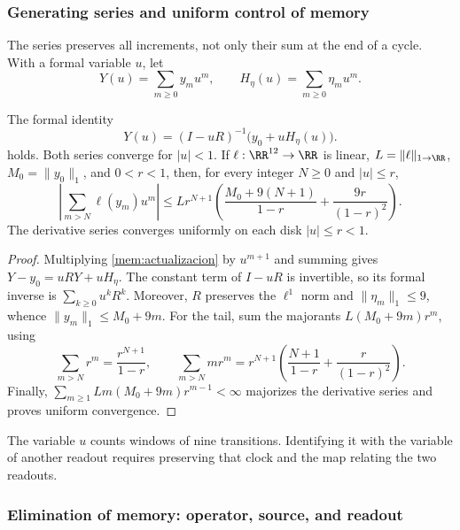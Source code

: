 \subsubsection{Generating series and uniform control of memory}

The series preserves all increments, not only their sum at the end
of a cycle. With a formal variable \(u\), let
\[
 Y(u)=\sum_{m\geq0}y_mu^m,\qquad
 H_\eta(u)=\sum_{m\geq0}\eta_mu^m.
\]

\begin{proposition}
\label{mem:prop-serie}
The formal identity
\begin{equation}
 Y(u)=(I-uR)^{-1}\bigl(y_0+uH_\eta(u)\bigr).
 \label{mem:serie}
\end{equation}
holds.
Both series converge for \(|u|<1\). If \(\ell:\RR^{12}\to\RR\)
is linear, \(L=\|\ell\|_{1\to\RR}\), \(M_0=\|y_0\|_1\), and
\(0<r<1\), then, for every integer \(N\geq0\) and \(|u|\leq r\),
\begin{equation}
 \left|\sum_{m>N}\ell(y_m)u^m\right|
 \leq Lr^{N+1}\left(
 \frac{M_0+9(N+1)}{1-r}+\frac{9r}{(1-r)^2}\right).
 \label{mem:cota}
\end{equation}
The derivative series converges uniformly on each disk
\(|u|\leq r<1\).
\end{proposition}
\begin{proof}
Multiplying \eqref{mem:actualizacion} by \(u^{m+1}\) and summing gives
\(Y-y_0=uRY+uH_\eta\). The constant term of \(I-uR\) is
invertible, so its formal inverse is \(\sum_{k\geq0}u^kR^k\).
Moreover, \(R\) preserves the \(\ell^1\) norm and
\(\|\eta_m\|_1\leq9\), whence
\(\|y_m\|_1\leq M_0+9m\).
For the tail, sum the majorants
\(L(M_0+9m)r^m\), using
\[
 \sum_{m>N}r^m=\frac{r^{N+1}}{1-r},\qquad
 \sum_{m>N}mr^m=r^{N+1}
 \left(\frac{N+1}{1-r}+\frac r{(1-r)^2}\right).
\]
Finally, \(\sum_{m\geq1}Lm(M_0+9m)r^{m-1}<\infty\)
majorizes the derivative series and proves uniform convergence.
\end{proof}

The variable \(u\) counts windows of nine transitions. Identifying it
with the variable of another readout requires preserving that clock and the map
relating the two readouts.

\subsubsection{Elimination of memory: operator, source, and readout}

